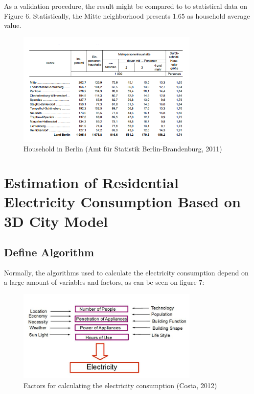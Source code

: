 \documentclass[11pt]{article}
\begin{document}
As a validation procedure, the result might be compared to to statistical data on Figure 6. Statistically, the Mitte neighborhood presents 1.65 as household average value.

\begin{figure}[ht]
	\centering
	\includegraphics[width=0.8\textwidth]{fig7.png}
	\caption{ Household in Berlin (Amt für Statistik Berlin-Brandenburg, 2011)}
	\label{fig:figure7}
\end{figure}

\section{Estimation of Residential Electricity Consumption Based on 3D City Model}

\subsection{Define Algorithm}

Normally, the algorithms used to calculate the electricity consumption depend on a large amount of variables and factors, as can be seen on figure 7:\\

\begin{figure}[htb!]
	\centering
	\includegraphics[width=0.8\textwidth]{fig8.png}
	\caption{Factors for calculating the electricity consumption (Costa, 2012) }
	\label{fig:figure8}
\end{figure}
\end{document}
